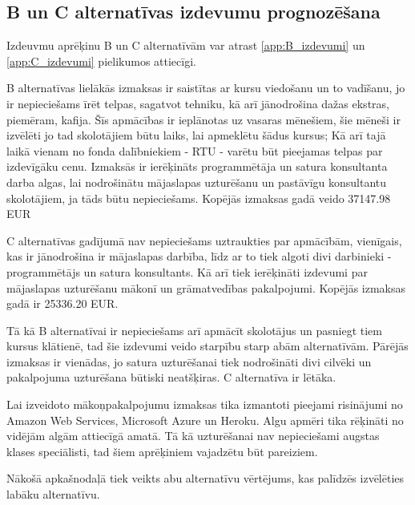 \subsection{B un C alternatīvas izdevumu prognozēšana}
Izdeuvmu aprēķinu B un C alternatīvām var atrast \ref{app:B_izdevumi} un \ref{app:C_izdevumi} pielikumos attiecīgi.
\par
B alternatīvas lielākās izmaksas ir saistītas ar kursu viedošanu un to vadīšanu, jo ir nepieciešams īrēt telpas,
sagatvot tehniku, kā arī jānodrošina dažas ekstras, piemēram, kafija. Šīs apmācības ir ieplānotas uz vasaras mēnešiem,
šie mēneši ir izvēlēti jo tad skolotājiem būtu laiks, lai apmeklētu šādus kursus; Kā arī tajā laikā vienam no fonda 
dalībniekiem - RTU - varētu būt pieejamas telpas par izdevīgāku cenu. Izmaksās ir ierēķināts programmētāja un satura
konsultanta darba algas, lai nodrošinātu mājaslapas uzturēšanu un pastāvīgu konsultantu skolotājiem, ja tāds būtu
nepieciešams. Kopējās izmaksas gadā veido 37147.98 EUR
\par
C alternatīvas gadījumā nav nepieciešams uztraukties par apmācībām, vienīgais, kas ir jānodrošina ir mājaslapas darbība,
līdz ar to tiek algoti divi darbinieki - programmētājs un satura konsultants. Kā arī tiek ierēķināti izdevumi par
mājaslapas uzturēšanu mākonī un grāmatvedības pakalpojumi. Kopējās izmaksas gadā ir 25336.20 EUR.
\par
Tā kā B alternatīvai ir nepieciešams arī apmācīt skolotājus un pasniegt tiem kursus klātienē, tad šie izdevumi veido
starpību starp abām alternatīvām. Pārējās izmaksas ir vienādas, jo satura uzturēšanai tiek nodrošināti divi cilvēki un
pakalpojuma uzturēšana būtiski neatšķiras. C alternatīva ir lētāka.
\par
Lai izveidoto mākoņpakalpojumu izmaksas tika izmantoti pieejami risinājumi no Amazon Web Services, Microsoft Azure un
Heroku. Algu apmēri tika rēķināti no vidējām algām attiecīgā amatā. Tā kā uzturēšanai nav nepieciešami augstas klases
speciālisti, tad šiem aprēķiniem vajadzētu būt pareiziem.
\par
Nākošā apkašnodaļā tiek veikts abu alternatīvu vērtējums, kas palīdzēs izvēlēties labāku alternatīvu.
